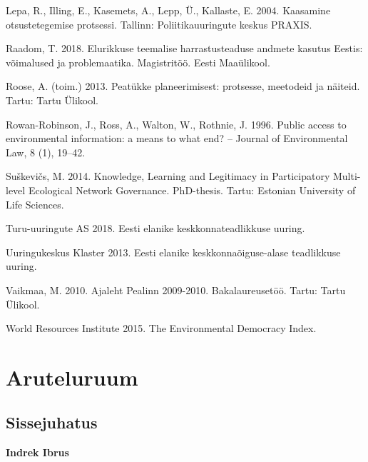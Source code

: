 \documentclass[estonian,]{article}
\begin{document}
Lepa, R., Illing, E., Kasemets, A., Lepp, Ü., Kallaste, E. 2004. Kaasamine otsustetegemise protsessi. Tallinn: Poliitikauuringute keskus PRAXIS.

Raadom, T. 2018. Elurikkuse teemalise harrastusteaduse andmete kasutus Eestis: võimalused ja problemaatika. Magistritöö. Eesti Maaülikool.

Roose, A. (toim.) 2013. Peatükke planeerimisest: protsesse, meetodeid ja näiteid. Tartu: Tartu Ülikool.

Rowan-Robinson, J., Ross, A., Walton, W., Rothnie, J. 1996. Public access to environmental information: a means to what end? -- Journal of Environmental Law, 8 (1), 19--42.

Suškevičs, M. 2014. Knowledge, Learning and Legitimacy in Participatory Multi-level Ecological Network Governance. PhD-thesis. Tartu: Estonian University of Life Sciences.

Turu-uuringute AS 2018. Eesti elanike keskkonnateadlikkuse uuring.

Uuringukeskus Klaster 2013. Eesti elanike keskkonnaõiguse-alase teadlikkuse uuring.

Vaikmaa, M. 2010. Ajaleht Pealinn 2009-2010. Bakalaureusetöö. Tartu: Tartu Ülikool.

World Resources Institute 2015. The Environmental Democracy Index.

\hypertarget{aruteluruum}{%
\section{Aruteluruum}\label{aruteluruum}}

\hypertarget{sissejuhatus-3}{%
\subsection*{Sissejuhatus}\label{sissejuhatus-3}}

\begin{authors}
\textbf{Indrek Ibrus}
\end{authors}
\end{document}

